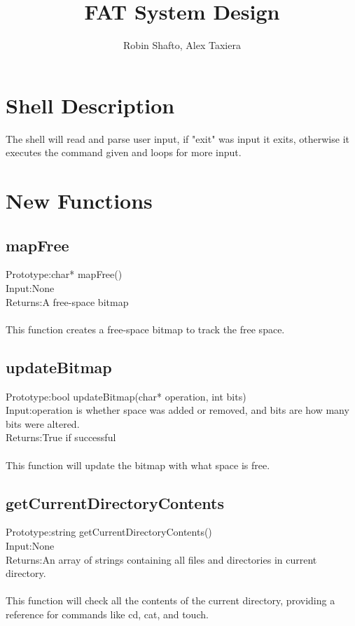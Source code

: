 \documentclass[a4paper]{article}
\title{FAT System Design}
\author{Robin Shafto, Alex Taxiera}
\begin{document}
\maketitle

\section{Shell Description}

The shell will read and parse user input, if "exit" was input it exits, otherwise it executes the command given and loops for more input.
\section{New Functions}


\subsection{mapFree}
Prototype:\hspace{0.2cm}char* mapFree()\\
Input:\hspace{0.88cm}None\\
Returns:\hspace{0.51cm}A free-space bitmap\\\\
This function creates a free-space bitmap to track the free space.

\subsection{updateBitmap}
Prototype:\hspace{0.2cm}bool updateBitmap(char* operation, int bits)\\
Input:\hspace{0.88cm}operation is whether space was added or removed, and bits are how many bits were altered.\\
Returns:\hspace{0.51cm}True if successful\\\\
This function will update the bitmap with what space is free.

\subsection{getCurrentDirectoryContents}
Prototype:\hspace{0.2cm}string getCurrentDirectoryContents()\\
Input:\hspace{0.88cm}None\\
Returns:\hspace{0.51cm}An array of strings containing all files and directories in current directory.\\\\
This function will check all the contents of the current directory, providing a reference for commands like cd, cat, and touch.
\end{document}
